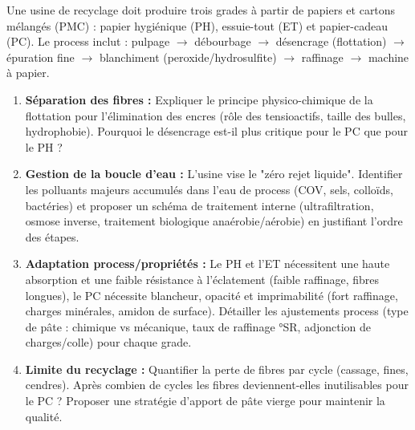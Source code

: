 \documentclass[11pt]{article}
\begin{document}
\begin{exercice}
Une usine de recyclage doit produire trois grades à partir de papiers et cartons mélangés (PMC) : papier hygiénique (PH), essuie-tout (ET) et papier-cadeau (PC). Le process inclut : pulpage $\rightarrow$ débourbage $\rightarrow$ désencrage (flottation) $\rightarrow$ épuration fine $\rightarrow$ blanchiment (peroxide/hydrosulfite) $\rightarrow$ raffinage $\rightarrow$ machine à papier.
\begin{enumerate}
    \item \textbf{Séparation des fibres :} Expliquer le principe physico-chimique de la flottation pour l'élimination des encres (rôle des tensioactifs, taille des bulles, hydrophobie). Pourquoi le désencrage est-il plus critique pour le PC que pour le PH ?
    \item \textbf{Gestion de la boucle d'eau :} L'usine vise le "zéro rejet liquide". Identifier les polluants majeurs accumulés dans l'eau de process (COV, sels, colloïds, bactéries) et proposer un schéma de traitement interne (ultrafiltration, osmose inverse, traitement biologique anaérobie/aérobie) en justifiant l'ordre des étapes.
    \item \textbf{Adaptation process/propriétés :} Le PH et l'ET nécessitent une haute absorption et une faible résistance à l'éclatement (faible raffinage, fibres longues), le PC nécessite blancheur, opacité et imprimabilité (fort raffinage, charges minérales, amidon de surface). Détailler les ajustements process (type de pâte : chimique vs mécanique, taux de raffinage °SR, adjonction de charges/colle) pour chaque grade.
    \item \textbf{Limite du recyclage :} Quantifier la perte de fibres par cycle (cassage, fines, cendres). Après combien de cycles les fibres deviennent-elles inutilisables pour le PC ? Proposer une stratégie d'apport de pâte vierge pour maintenir la qualité.
\end{enumerate}
\end{exercice}
\end{document}
